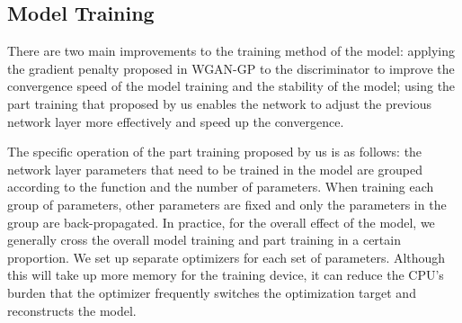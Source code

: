 \subsection{Model Training}
There are two main improvements to the training method of the model:
    applying the gradient penalty proposed in WGAN-GP to the discriminator to improve the convergence speed of the model training and the stability of the model;
    using the part training that proposed by us enables the network to adjust the previous network layer more effectively and speed up the convergence.

The specific operation of the part training proposed by us is as follows: the network layer parameters that need to be trained in the model are grouped according to the function and the number of parameters.
When training each group of parameters, other parameters are fixed and only the parameters in the group are back-propagated.
In practice, for the overall effect of the model, we generally cross the overall model training and part training in a certain proportion.
We set up separate optimizers for each set of parameters.
Although this will take up more memory for the training device, it can reduce the CPU's burden that the optimizer frequently switches the optimization target and reconstructs the model.